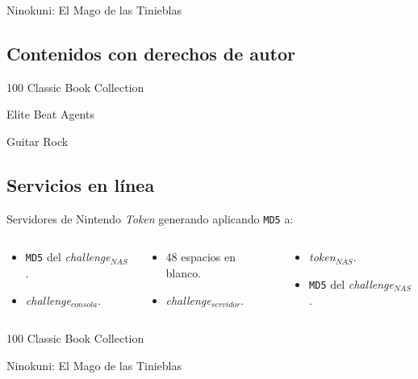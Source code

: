 \begin{frame}{Ninokuni: El Mago de las Tinieblas}

\end{frame}

\subsection{Contenidos con derechos de autor}
\begin{frame}{100 Classic Book Collection}

\end{frame}

\begin{frame}{Elite Beat Agents}

\end{frame}

\begin{frame}{Guitar Rock}

\end{frame}


\subsection{Servicios en línea}
\begin{frame}{Servidores de Nintendo}
\textit{Token} generando aplicando \texttt{MD5} a:
\begin{columns}

\begin{column}{0.33\textwidth}\begin{itemize}
    \item \texttt{MD5} del \textit{challenge}$_{NAS}$.
    \item \textit{challenge}$_{consola}$.
\end{itemize}\end{column}

\begin{column}{0.33\textwidth}\begin{itemize}
    \item 48 espacios en blanco.
    \item \textit{challenge}$_{servidor}$.
\end{itemize}\end{column}

\begin{column}{0.33\textwidth}\begin{itemize}
    \item \textit{token}$_{NAS}$.
    \item \texttt{MD5} del \textit{challenge}$_{NAS}$.
\end{itemize}\end{column}

\end{columns}
\end{frame}

\begin{frame}{100 Classic Book Collection}

\end{frame}

\begin{frame}{Ninokuni: El Mago de las Tinieblas}

\end{frame}

\backupend
